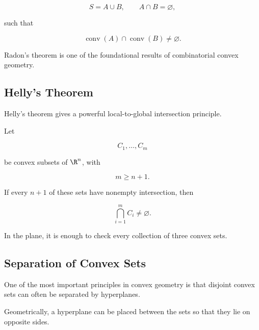 \[
S=A\cup B,
\qquad
A\cap B=\varnothing,
\]

such that

\[
\boxed{
\operatorname{conv}(A)
\cap
\operatorname{conv}(B)
\neq
\varnothing.
}
\]

Radon's theorem is one of the foundational results of combinatorial convex
geometry.

\subsection{Helly's Theorem}
\label{subsec:helly-theorem}

Helly's theorem gives a powerful local-to-global intersection principle.

\begin{theorem}
Let

\[
C_1,\ldots,C_m
\]

be convex subsets of \(\R^n\), with

\[
m\geq n+1.
\]

If every \(n+1\) of these sets have nonempty intersection, then

\[
\boxed{
\bigcap_{i=1}^{m}C_i\neq\varnothing.
}
\]
\end{theorem}

In the plane, it is enough to check every collection of three convex sets.

\subsection{Separation of Convex Sets}
\label{subsec:convex-separation}

One of the most important principles in convex geometry is that disjoint
convex sets can often be separated by hyperplanes.

Geometrically, a hyperplane can be placed between the sets so that they lie
on opposite sides.

\begin{centereddiagram}
\end{centereddiagram}

